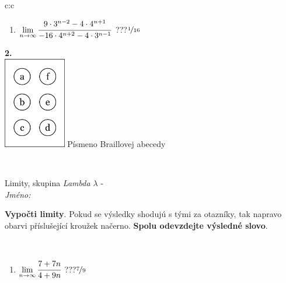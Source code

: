\documentclass[10pt]{report}
\begin{document}
\begin{tabular}{c:c}
\begin{minipage}[c][104.5mm][t]{0.5\linewidth}
\begin{center}
\begin{minipage}{0.79\linewidth}
\begin{center}
\begin{varwidth}{\linewidth}
\begin{enumerate}
\item $\lim\limits_{n\to\infty}\cfrac{9\cdot 3^{n-2}-4\cdot 4^{n+1}}{-16\cdot 4^{n+2}-4\cdot 3^{n-1}}$\quad \dotfill\; ???\;\dotfill \quad $\nicefrac{1}{16}$
\end{enumerate}
\end{varwidth}
\end{center}
\end{minipage}
\begin{minipage}{0.20\linewidth}
\begin{center}
{\Huge\bfseries 2.} \\[2mm]
\includegraphics[height=40mm]{../images/braille.png}
{\small Písmeno Braillovej abecedy}
\end{center}
\end{minipage}
\end{center}
\end{minipage}
\\ \hdashline
\begin{minipage}[c][104.5mm][t]{0.5\linewidth}
\begin{center}
\vspace{7mm}
{\huge Limity, skupina \textit{Lambda $\lambda$} -}\\[5mm]
\textit{Jméno:}\phantom{xxxxxxxxxxxxxxxxxxxxxxxxxxxxxxxxxxxxxxxxxxxxxxxxxxxxxxxxxxxxxxxxx}\\[5mm]
\begin{minipage}{0.95\linewidth}
\begin{center}
\textbf{Vypočti limity}. Pokud se výsledky shodujú s tými za otazníky, tak napravo\\obarvi příslušející kroužek načerno. \textbf{Spolu odevzdejte výsledné slovo}.
\end{center}
\end{minipage}
\\[1mm]
\begin{minipage}{0.79\linewidth}
\begin{center}
\begin{varwidth}{\linewidth}
\begin{enumerate}
\normalsize
\item $\lim\limits_{n\to\infty}\cfrac{7+7n}{4+9n}$\quad \dotfill\; ???\;\dotfill \quad $\nicefrac{7}{9}$

\end{enumerate}
\end{varwidth}
\end{center}
\end{minipage}
\end{center}
\end{minipage}
\end{tabular}
\end{document}
